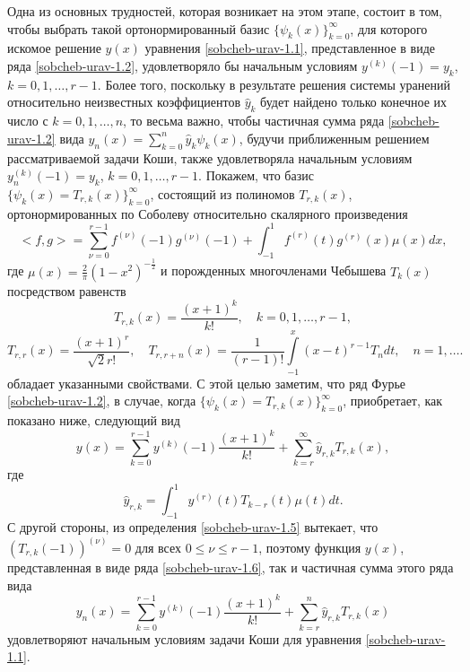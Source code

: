 Одна из основных трудностей, которая возникает на этом этапе, состоит в том, чтобы
выбрать такой ортонормированный базис $\{\psi_k(x)\}_{k=0}^\infty$, для которого искомое решение $y(x)$ уравнения \eqref{sobcheb-urav-1.1}, представленное в виде ряда  \eqref{sobcheb-urav-1.2}, удовлетворяло бы начальным условиям $y^{(k)}(-1)=y_k$, $k=0,1,\ldots,r-1$. Более того, поскольку в результате решения системы уранений относительно неизвестных коэффициентов $\hat y_k$  будет найдено только конечное их число с $k=0,1,\ldots, n$, то весьма важно, чтобы частичная сумма ряда \eqref{sobcheb-urav-1.2} вида $ y_n(x)=\sum_{k=0}^n\hat y_k\psi_k(x)$,
 будучи приближенным решением рассматриваемой задачи Коши, также удовлетворяла начальным условиям $y_n^{(k)}(-1)=y_k$, $k=0,1,\ldots,r-1$. Покажем, что  базис $\{\psi_k(x)=T_{r,k}(x)\}_{k=0}^\infty$, состоящий из полиномов
$T_{r,k}(x)$, ортонормированных по Соболеву относительно скалярного произведения
\begin{equation}\label{sobcheb-urav-1.3}
<f,g>=\sum_{\nu=0}^{r-1}f^{(\nu)}(-1)g^{(\nu)}(-1)+\int_{-1}^{1}f^{(r)}(t)g^{(r)}(x)\mu(x)dx,
\end{equation}
где $\mu(x)=\frac2\pi(1-x^2)^{-\frac12}$ и порожденных многочленами Чебышева  $T_{k}(x)$ посредством равенств
   \begin{equation}\label{sobcheb-urav-1.4}
T_{r,k}(x) =\frac{(x+1)^k}{k!}, \quad k=0,1,\ldots, r-1,
\end{equation}
  \begin{equation}\label{sobcheb-urav-1.5}
 T_{r,r}(x) =\frac{(x+1)^r}{\sqrt{2}r!},\quad T_{r,r+n}(x) =\frac{1}{(r-1)!}\int\limits_{-1}^x(x-t)^{r-1}T_{n}dt, \quad n=1,\ldots.
\end{equation}
   обладает указанными свойствами. С этой целью заметим, что ряд Фурье \eqref{sobcheb-urav-1.2}, в случае, когда $\{\psi_k(x)=T_{r,k}(x)\}_{k=0}^\infty$, приобретает, как показано ниже, следующий вид
   \begin{equation}\label{sobcheb-urav-1.6}
y(x)= \sum_{k=0}^{r-1} y^{(k)}(-1)\frac{(x+1)^k}{k!}+ \sum_{k=r}^\infty \hat y_{r,k}T_{r,k}(x),
\end{equation}
где
  \begin{equation}\label{sobcheb-urav-1.7}
 \hat y_{r,k}=\int_{-1}^1 y^{(r)}(t)T_{k-r}(t)\mu(t)dt.
\end{equation}
С другой стороны, из определения \eqref{sobcheb-urav-1.5} вытекает, что $(T_{r,k}(-1))^{(\nu)}=0$ для всех $0\le\nu\le r-1$, поэтому функция $y(x)$, представленная в виде ряда \eqref{sobcheb-urav-1.6}, так и частичная  сумма этого ряда вида
 \begin{equation}\label{sobcheb-urav-1.8}
y_n(x)= \sum_{k=0}^{r-1} y^{(k)}(-1)\frac{(x+1)^k}{k!}+ \sum_{k=r}^n \hat y_{r,k}T_{r,k}(x)
\end{equation}
удовлетворяют начальным условиям задачи Коши для уравнения \eqref{sobcheb-urav-1.1}.

